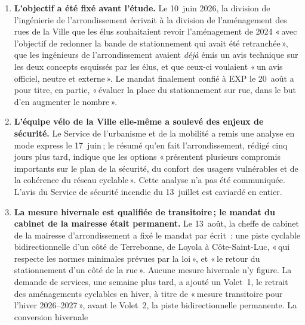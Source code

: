 \documentclass[11pt,letterpaper]{article}
\begin{document}
\begin{enumerate}[nosep]
  \item \begin{minipage}[t]{\linewidth}\textbf{L'objectif a été fixé avant l'étude.} Le 10~juin 2026, la
    division de l'ingénierie de l'arrondissement écrivait à la division de
    l'aménagement des rues de la Ville que les élus souhaitaient revoir
    l'aménagement de 2024 «\,avec l'objectif de redonner la bande de
    stationnement qui avait été retranchée\,», que les ingénieurs de
    l'arrondissement avaient \emph{déjà} émis un avis technique sur les deux
    concepts esquissés par les élus, et que ceux-ci voulaient «\,un avis
    officiel, neutre et externe\,». Le mandat finalement confié à EXP le
    20~août a pour titre, en partie, «\,évaluer la place du stationnement sur
    rue, dans le but d'en augmenter le nombre\,».\end{minipage}\vspace{0.35em}
\item \begin{minipage}[t]{\linewidth}\textbf{L'équipe vélo de la Ville elle-même a soulevé des enjeux
    de sécurité.} Le Service de l'urbanisme et de la mobilité a remis une
    analyse en mode express le 17~juin\,; le résumé qu'en fait
    l'arrondissement, rédigé cinq jours plus tard, indique que les options
    «\,présentent plusieurs compromis importants sur le plan de la sécurité,
    du confort des usagers vulnérables et de la cohérence du réseau
    cyclable\,». Cette analyse n'a pas été communiquée. L'avis du Service de
    sécurité incendie du 13~juillet est caviardé en entier.\end{minipage}\vspace{0.35em}
\item \begin{minipage}[t]{\linewidth}\textbf{La mesure hivernale est qualifiée de transitoire\,; le
    mandat du cabinet de la mairesse était permanent.} Le 13~août, la cheffe
    de cabinet de la mairesse d'arrondissement a fixé le mandat par écrit~:
    une piste cyclable bidirectionnelle d'un côté de Terrebonne, de Loyola à
    Côte-Saint-Luc, «\,qui respecte les normes minimales prévues par la loi\,»,
    et «\,le retour du stationnement d'un côté de la rue\,». Aucune mesure
    hivernale n'y figure. La demande de services, une semaine plus tard, a
    ajouté un Volet~1, le retrait des aménagements cyclables en hiver, à
    titre de «\,mesure transitoire pour l'hiver 2026--2027\,», avant le
    Volet~2, la piste bidirectionnelle permanente. La conversion hivernale

\end{minipage}
\end{enumerate}
\end{document}
